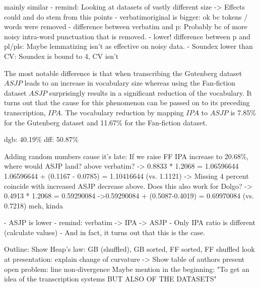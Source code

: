 mainly similar
- remind: Looking at datasets of vastly different size -> Effects could and do stem from this
points
- verbatimoriginal is bigger: ok bc tokens / words were removed
- difference between verbatim and p: Probably bc of more noisy intra-word punctuation that is removed.
- lower! difference between p and pl/pls: Maybe lemmatizing isn't as effective on noisy data.
- Soundex lower than CV: Soundex is bound to 4, CV isn't

The most notable difference is that when transcribing the Gutenberg dataset $ASJP$ leads to an increase in vocabulary size whereas using the Fan-fiction dataset $ASJP$ surprisingly results in a significant reduction of the vocabulary.
It turns out that the cause for this phenomenon can be passed on to its preceding transcription, $IPA$.
The vocabulary reduction by mapping $IPA$ to $ASJP$ is 7.85\% for the Gutenberg dataset and 11.67\% for the Fan-fiction dataset.

dgb: 40.19\%
dff: 50.87\%

Adding random numbers cause it's late:
If we raise FF IPA increase to 20.68\%, where would ASJP land? above verbatim?
-> 0.8833 * 1.2068 = 1.06596644
 1.06596644 + (0.1167 - 0.0785) = 1.10416644 (vs. 1.1121)
-> Missing 4 percent coincide with increased ASJP decrease above.
Does this also work for Dolgo?
-> 0.4913 * 1.2068 = 0.59290084
->0.59290084 + (0.5087-0.4019) = 0.69970084 (vs. 0.7218)
meh, kinda


- ASJP is lower
- remind: verbatim -> IPA -> ASJP
- Only IPA ratio is different (calculate values)
- And in fact, it turns out that this is the case.


Outline:
Show Heap's law: GB (shuffled), GB sorted, FF sorted, FF shuffled
look at presentation: explain change of curvature
-> Show table of authors
present open problem: line non-divergence
Maybe mention in the beginning: "To get an idea of the transcription systems BUT ALSO OF THE DATASETS"




